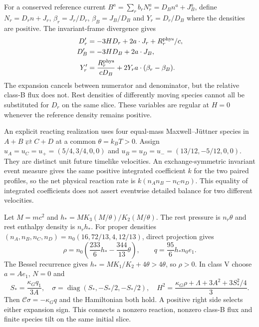 For a conserved reference current $B^a=\sum_rb_rN_r^a=D_Bn^a+J_B^a$, define $N_r=D_rn+J_r$, $\beta_r=J_r/D_r$, $\beta_B=J_B/D_B$ and $Y_r=D_r/D_B$ where the densities are positive. The invariant-frame divergence gives
\begin{align}
 D_r'&=-3HD_r+2a\cdot J_r+R_r^{\rm phys}/c,\nonumber\\
 D_B'&=-3HD_B+2a\cdot J_B,\nonumber\\
 Y_r'&=\frac{R_r^{\rm phys}}{cD_B}
             +2Y_r a\cdot(\beta_r-\beta_B).
 \label{geo:abundance_current}
\end{align}
The expansion cancels between numerator and denominator, but the relative class-B flux does not. Rest densities of differently moving species cannot all be substituted for $D_r$ on the same slice. These variables are regular at $H=0$ whenever the reference density remains positive.

An explicit reacting realization uses four equal-mass Maxwell--J\"uttner species in $A+B\rightleftarrows C+D$ at a common $\theta=k_BT>0$. Assign $u_A=u_C=u_+=(5/4,3/4,0,0)$ and $u_B=u_D=u_-=(13/12,-5/12,0,0)$. They are distinct unit future timelike velocities. An exchange-symmetric invariant event measure gives the same positive integrated coefficient $k$ for the two paired profiles, so the net physical reaction rate is $k(n_An_B-n_Cn_D)$. This equality of integrated coefficients does not assert eventwise detailed balance for two different velocities.

Let $M=mc^2$ and $h_*=M K_3(M/\theta)/K_2(M/\theta)$. The rest pressure is $n_r\theta$ and rest enthalpy density is $n_rh_*$. For proper densities
$(n_A,n_B,n_C,n_D)=n_0(16,72/13,4,12/13)$, direct projection gives
\begin{equation}
 \rho=n_0\left(\frac{233}{6}h_*-\frac{344}{13}\theta\right),\qquad
 q=\frac{95}{6}h_*n_0e_1.
 \label{geo:reacting_flux}
\end{equation}
The Bessel recurrence gives $h_*=MK_1/K_2+4\theta>4\theta$, so $\rho>0$. In class V choose $a=Ae_1$, $N=0$ and
\begin{equation}
 S_*=\frac{\kappa_Gq_1}{3A},\quad
 \sigma=\operatorname{diag}(S_*,-S_*/2,-S_*/2),\quad
 H^2=\frac{\kappa_G\rho+\Lambda+3A^2+3S_*^2/4}{3}.
 \label{geo:reacting_V}
\end{equation}
Then $\mathcal C\sigma=-\kappa_Gq$ and the Hamiltonian both hold. A positive right side selects either expansion sign. This connects a nonzero reaction, nonzero class-B flux and finite species tilt on the same initial slice.

